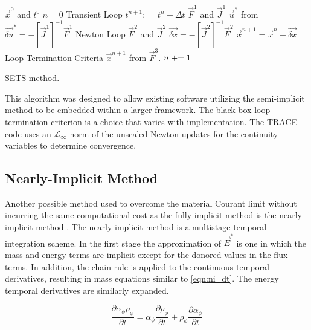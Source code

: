 \begin{algo}[ht!]
\setlength{\baselineskip}{0.625\baselineskip}
\begin{algorithmic}[1]
\Require $\vec{x}^{0}$ and $t^{0}$
\Set $n = 0$
\Loop \; Transient Loop
    \Set $t^{n+1} : = t^{n} + \Delta t$
	\Calculate $\vec{F}^{1}$ and $\vec{J}^{1}$
	\Calculate $\vec{u}^{*}$ from $\vec{\delta u}^{*} = -\left[\vec{J}^{1}\right]^{-1} \vec{F}^{1}$
	\Loop \; Newton Loop
		\Calculate $\vec{F}^{2}$ and $\vec{J}^{2}$
		\Calculate $\vec{\delta x} = - \left[\vec{J}^{2}\right]^{-1} \vec{F}^{2}$
		\Calculate $\vec{x}^{n+1} = \vec{x}^{n} + \vec{\delta x}$
		\BlackBox Loop Termination Criteria
	\EndLoop
	\Calculate $\vec{x}^{n+1}$ from $\vec{F}^{3}$.
	\Set $n \mathrel{+}= 1$
\EndLoop
\end{algorithmic}
\caption{SETS method.}
\label{alg:sets}
\end{algo}

This algorithm was designed to allow existing software utilizing the semi-implicit method to be embedded within a larger framework.
The black-box loop termination criterion is a choice that varies with implementation.
The TRACE code uses an $\mathcal{L}_{\infty}$ norm of the unscaled Newton updates for the continuity variables to determine convergence.

\subsection{Nearly-Implicit Method}
\label{subsect:numerics_nearly_implicit}
Another possible method used to overcome the material Courant limit without incurring the same computational cost as the fully implicit method is the nearly-implicit method \cite{Trapp1986, RELAP}.
The nearly-implicit method is a multistage temporal integration scheme.
In the first stage the approximation  of $\vec{E}^{*}$ is one in which the mass and energy terms are implicit except for the donored values in the flux terms. 
In addition, the chain rule is applied to the continuous temporal derivatives, resulting in mass equations similar to \eqref{eqn:ni_dt}.
The energy temporal derivatives are similarly expanded.

\begin{equation}
\label{eqn:ni_dt}
\frac{\partial \alpha_{\phi} \rho_{\phi}}{\partial t} = \alpha_{\phi} \frac{\partial \rho_{\phi}}{\partial t} + \rho_{\phi} \frac{\partial \alpha_{\phi}}{\partial t}
\end{equation}

